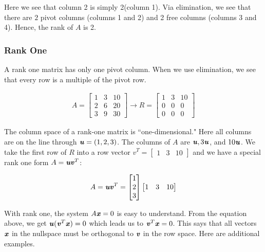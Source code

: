 \documentclass[12pt, letterpaper]{article}
\newcommand{\V}[1]{\textbf{\textit{#1}}}
\theoremstyle{definition}
\begin{document}
		Here we see that column 2 is simply 2(column 1). Via elimination, we see that there are $2$ pivot columns (columns 1 and 2) and 2 free columns (columns 3 and 4). Hence, the rank of $A$ is 2.
		
\subsubsection{Rank One}
	A rank one matrix has only one pivot column. When we use elimination, we see that every row is a multiple of the pivot row.
	
	\begin{gather*}
			A = \begin{bmatrix}
					1 & 3 & 10 \\
					2 & 6 & 20 \\
					3 & 9 & 30
					\end{bmatrix} \rightarrow R = \begin{bmatrix}
														1 & 3 & 10 \\
														0 & 0 & 0 \\
														0 & 0 & 0
														\end{bmatrix}
	\end{gather*}
	
	The column space of a rank-one matrix is ``one-dimensional." Here all columns are on the line through $\V{u}=(1,2,3)$. The columns of $A$ are $\V{u}, 3\V{u}$, and $10\V{u}$. We take the first row of $R$ into a row vector $v^T = \begin{bmatrix} 1 & 3 & 10 \end{bmatrix}$ and we have a special rank one form $A=\V{uv}^T$:
				
				\begin{gather*}
					A = \V{uv}^T = \begin{bmatrix} 1 \\ 2 \\ 3 \end{bmatrix} \begin{bmatrix} 1 & 3 & 10 \end{bmatrix}
				\end{gather*}
				
	With rank one, the system $A\V{x} = 0$ is easy to understand. From the equation above, we get $\V{u}(\V{v}^T \V{x})=0$ which leads us to $\V{v}^T \V{x} = 0$. This says that all vectors $\V{x}$ in the nullspace must be orthogonal to $\V{v}$ in the row space. Here are additional examples.
	
\end{document}

